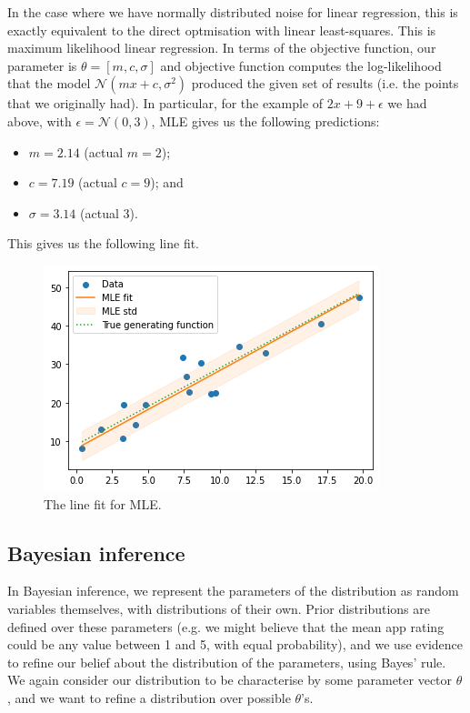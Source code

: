 \documentclass[a4paper, openany]{memoir}
\begin{document}
In the case where we have normally distributed noise for linear regression, this is exactly equivalent to the direct optmisation with linear least-squares. This is maximum likelihood linear regression. In terms of the objective function, our parameter is $\theta = [m, c, \sigma]$ and objective function computes the log-likelihood that the model $\mathcal{N}(mx + c, \sigma^2)$ produced the given set of results (i.e. the points that we originally had). In particular, for the example of $2x+9+\epsilon$ we had above, with $\epsilon = \mathcal{N}(0, 3)$, MLE gives us the following predictions:
\begin{itemize}
    \item $m = 2.14$ (actual $m = 2$);
    \item $c = 7.19$ (actual $c = 9$); and
    \item $\sigma = 3.14$ (actual $3$).
\end{itemize}
This gives us the following line fit.
\begin{figure}[H]
    \centering
    \includegraphics[scale=0.7]{src/5.28 linefit mle.png}
    \caption{The line fit for MLE.}
\end{figure}

\subsection{Bayesian inference}
In Bayesian inference, we represent the parameters of the distribution as random variables themselves, with distributions of their own. Prior distributions are defined over these parameters (e.g. we might believe that the mean app rating could be any value between 1 and 5, with equal probability), and we use evidence to refine our belief about the distribution of the parameters, using Bayes' rule. We again consider our distribution to be characterise by some parameter vector $\theta$, and we want to refine a distribution over possible $\theta$'s.
\end{document}
